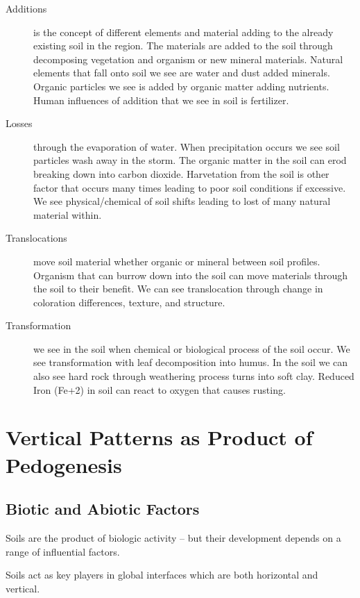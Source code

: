 \begin{description}
	\item[Additions] is the concept of different elements and material adding to the already existing soil in the region. The materials are added to the soil through decomposing vegetation and organism or new mineral materials.  Natural elements that fall onto soil we see are water and dust added minerals. Organic particles we see is added by organic matter adding nutrients. Human influences of addition that we see in soil is fertilizer. 

\item[Losses] through the evaporation of water. When precipitation occurs we see soil particles wash away in the storm. The organic matter in the soil can erod breaking down into carbon dioxide.  Harvetation from the soil is other factor that occurs many times leading to poor soil conditions if excessive. We see physical/chemical of soil shifts leading to lost of many natural material within. 

\item[Translocations] move soil material whether organic or mineral between soil profiles. Organism that can burrow down into the soil can move materials through the soil to their benefit. We can see translocation through change in coloration differences, texture, and structure.

\item[Transformation] we see in the soil when chemical or biological process of the soil occur. We see transformation with leaf decomposition into humus. In the soil we can also see hard rock through weathering process turns into soft clay. Reduced Iron (Fe+2) in soil can react to oxygen that causes rusting.

\end{description}

\section{Vertical Patterns as Product of Pedogenesis}

\subsection{Biotic and Abiotic Factors}

Soils are the product of biologic activity -- but their development depends on a range of influential factors. 


Soils act as key players in global interfaces which are both horizontal and vertical. 

